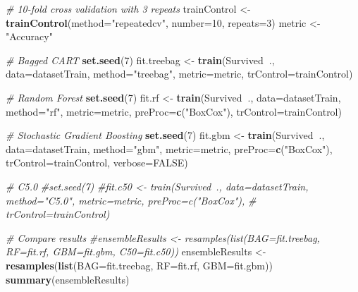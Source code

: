 \documentclass[]{article}
\newenvironment{Shaded}{\begin{snugshade}}{\end{snugshade}}
\newcommand{\KeywordTok}[1]{\textcolor[rgb]{0.13,0.29,0.53}{\textbf{#1}}}
\newcommand{\DataTypeTok}[1]{\textcolor[rgb]{0.13,0.29,0.53}{#1}}
\newcommand{\DecValTok}[1]{\textcolor[rgb]{0.00,0.00,0.81}{#1}}
\newcommand{\StringTok}[1]{\textcolor[rgb]{0.31,0.60,0.02}{#1}}
\newcommand{\CommentTok}[1]{\textcolor[rgb]{0.56,0.35,0.01}{\textit{#1}}}
\newcommand{\OtherTok}[1]{\textcolor[rgb]{0.56,0.35,0.01}{#1}}
\newcommand{\OperatorTok}[1]{\textcolor[rgb]{0.81,0.36,0.00}{\textbf{#1}}}
\newcommand{\NormalTok}[1]{#1}
\begin{document}
\begin{Shaded}
\begin{Highlighting}[]
\CommentTok{# 10-fold cross validation with 3 repeats}
\NormalTok{trainControl <-}\StringTok{ }\KeywordTok{trainControl}\NormalTok{(}\DataTypeTok{method=}\StringTok{"repeatedcv"}\NormalTok{, }\DataTypeTok{number=}\DecValTok{10}\NormalTok{, }\DataTypeTok{repeats=}\DecValTok{3}\NormalTok{)}
\NormalTok{metric <-}\StringTok{ "Accuracy"}

\CommentTok{# Bagged CART}
\KeywordTok{set.seed}\NormalTok{(}\DecValTok{7}\NormalTok{)}
\NormalTok{fit.treebag <-}\StringTok{ }\KeywordTok{train}\NormalTok{(Survived}\OperatorTok{~}\NormalTok{., }\DataTypeTok{data=}\NormalTok{datasetTrain, }\DataTypeTok{method=}\StringTok{"treebag"}\NormalTok{, }\DataTypeTok{metric=}\NormalTok{metric,}
    \DataTypeTok{trControl=}\NormalTok{trainControl)}

\CommentTok{# Random Forest}
\KeywordTok{set.seed}\NormalTok{(}\DecValTok{7}\NormalTok{)}
\NormalTok{fit.rf <-}\StringTok{ }\KeywordTok{train}\NormalTok{(Survived}\OperatorTok{~}\NormalTok{., }\DataTypeTok{data=}\NormalTok{datasetTrain, }\DataTypeTok{method=}\StringTok{"rf"}\NormalTok{, }\DataTypeTok{metric=}\NormalTok{metric, }\DataTypeTok{preProc=}\KeywordTok{c}\NormalTok{(}\StringTok{"BoxCox"}\NormalTok{),}
    \DataTypeTok{trControl=}\NormalTok{trainControl)}

\CommentTok{# Stochastic Gradient Boosting}
\KeywordTok{set.seed}\NormalTok{(}\DecValTok{7}\NormalTok{)}
\NormalTok{fit.gbm <-}\StringTok{ }\KeywordTok{train}\NormalTok{(Survived}\OperatorTok{~}\NormalTok{., }\DataTypeTok{data=}\NormalTok{datasetTrain, }\DataTypeTok{method=}\StringTok{"gbm"}\NormalTok{, }\DataTypeTok{metric=}\NormalTok{metric, }\DataTypeTok{preProc=}\KeywordTok{c}\NormalTok{(}\StringTok{"BoxCox"}\NormalTok{),}
    \DataTypeTok{trControl=}\NormalTok{trainControl, }\DataTypeTok{verbose=}\OtherTok{FALSE}\NormalTok{)}

\CommentTok{# C5.0}
\CommentTok{#set.seed(7)}
\CommentTok{#fit.c50 <- train(Survived~., data=datasetTrain, method="C5.0", metric=metric, preProc=c("BoxCox"),}
\CommentTok{#    trControl=trainControl)}

\CommentTok{# Compare results}
\CommentTok{#ensembleResults <- resamples(list(BAG=fit.treebag, RF=fit.rf, GBM=fit.gbm, C50=fit.c50))}
\NormalTok{ensembleResults <-}\StringTok{ }\KeywordTok{resamples}\NormalTok{(}\KeywordTok{list}\NormalTok{(}\DataTypeTok{BAG=}\NormalTok{fit.treebag, }\DataTypeTok{RF=}\NormalTok{fit.rf, }\DataTypeTok{GBM=}\NormalTok{fit.gbm))}
\KeywordTok{summary}\NormalTok{(ensembleResults)}
\end{Highlighting}
\end{Shaded}
\end{document}
